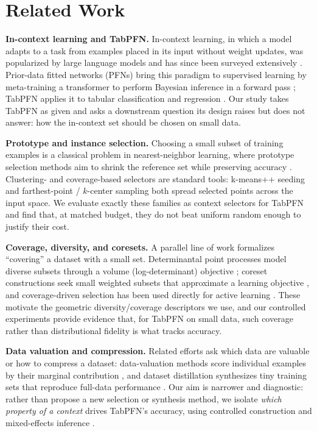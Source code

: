\documentclass[11pt,a4paper]{article}
\begin{document}
\section{Related Work}

\textbf{In-context learning and TabPFN.} In-context learning, in which a model
adapts to a task from examples placed in its input without weight updates, was
popularized by large language models \cite{brown2020gpt3} and has since been
surveyed extensively \cite{dong2024icl}. Prior-data fitted networks (PFNs) bring
this paradigm to supervised learning by meta-training a transformer to perform
Bayesian inference in a forward pass \cite{muller2022pfn}; TabPFN applies it to
tabular classification and regression \cite{hollmann2025tabpfn}. Our study takes
TabPFN as given and asks a downstream question its design raises but does not
answer: how the in-context set should be chosen on small data.

\textbf{Prototype and instance selection.} Choosing a small subset of training
examples is a classical problem in nearest-neighbor learning, where prototype
selection methods aim to shrink the reference set while preserving accuracy
\cite{garcia2012prototype}. Clustering- and coverage-based selectors are standard
tools: k-means++ seeding \cite{arthur2007kmeans} and farthest-point / $k$-center
sampling \cite{gonzalez1985clustering} both spread selected points across the
input space. We evaluate exactly these families as context selectors for TabPFN
and find that, at matched budget, they do not beat uniform random enough to
justify their cost.

\textbf{Coverage, diversity, and coresets.} A parallel line of work formalizes
``covering'' a dataset with a small set. Determinantal point processes model
diverse subsets through a volume (log-determinant) objective
\cite{kulesza2012dpp}; coreset constructions seek small weighted subsets that
approximate a learning objective \cite{feldman2020coresets}, and coverage-driven
selection has been used directly for active learning \cite{sener2018coreset}.
These motivate the geometric diversity/coverage descriptors we use, and our
controlled experiments provide evidence that, for TabPFN on small data, such
coverage rather than distributional fidelity is what tracks accuracy.

\textbf{Data valuation and compression.} Related efforts ask which data are
valuable or how to compress a dataset: data-valuation methods score individual
examples by their marginal contribution \cite{ghorbani2019datashapley}, and
dataset distillation synthesizes tiny training sets that reproduce full-data
performance \cite{wang2018distillation}. Our aim is narrower and diagnostic:
rather than propose a new selection or synthesis method, we isolate \emph{which
property of a context} drives TabPFN's accuracy, using controlled construction
and mixed-effects inference \cite{bates2015lme4}.
\end{document}
